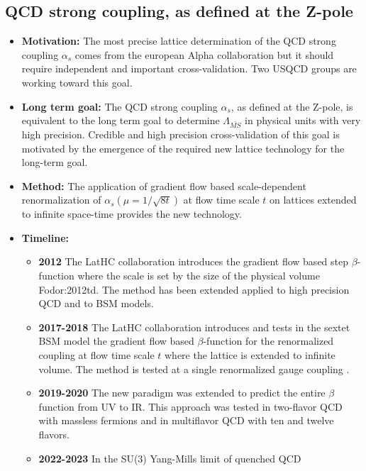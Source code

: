 \documentclass[12pt,hyperpdf]{article}
\begin{document}
\subsection{ QCD strong coupling, as defined at the Z-pole}
\begin{itemize}
	\item{\bf Motivation:}  The most precise lattice determination of
          the QCD strong coupling $\alpha_s$  comes from the european
          Alpha collaboration but  it should require independent and
          important  cross-validation. Two  USQCD  groups are working
          toward  this goal. 
	\item{\bf Long term goal:} The QCD strong coupling $\alpha_s$, as
          defined at the Z-pole, is equivalent to the long term goal
          to determine $\Lambda_{\overline{MS}}$  in physical units
          with very high precision. Credible and high precision
          cross-validation  of this goal  is motivated by the
          emergence of  the required new lattice  technology for the
          long-term goal. 
	\item{\bf Method:}  The application of gradient flow based
          scale-dependent renormalization of
          $\alpha_s(\mu=1/\sqrt{8t})$ at flow time scale $t$ on
          lattices extended to  infinite space-time provides the new
          technology.  
	\item{\bf Timeline:}
\begin{itemize}
	\item{\bf 2012} The LatHC collaboration introduces the gradient
          flow based step $\beta$-function where the scale is set by
          the size of the physical volume Fodor:2012td. The method
          has been extended  applied to high precision QCD and to BSM
          models.  
	\item{\bf 2017-2018} The LatHC collaboration introduces and tests
          in the sextet BSM model the  gradient flow based
          $\beta$-function for the renormalized coupling at flow time
          scale $t$ where the lattice is extended to infinite volume.
          The method is tested at a single renormalized gauge coupling
          \cite{Fodor:2017die}.  
	\item{\bf 2019-2020} The new paradigm was extended to predict the
          entire $\beta$ function from UV to IR. This approach was
          tested in two-flavor QCD with massless
          fermions\cite{Hasenfratz:2019hpg} and in multiflavor QCD
          with ten and twelve flavors. 
	\item{\bf 2022-2023} In the SU(3) Yang-Mills limit of quenched QCD

\end{itemize}
\end{itemize}
\end{document}
